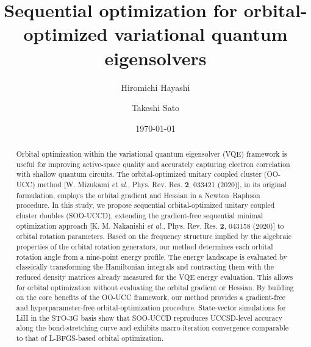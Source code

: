 \documentclass[
 reprint,
 amsmath,amssymb,
 aps,
 physrev,
]{revtex4-2}
\begin{document}
\title{Sequential optimization for orbital-optimized variational quantum eigensolvers}

\author{Hiromichi Hayashi}

\author{Takeshi Sato}
%

\date{\today}

\begin{abstract}
    Orbital optimization within the variational quantum eigensolver (VQE) framework is useful for improving active-space quality and accurately capturing electron correlation with shallow quantum circuits. The orbital-optimized unitary coupled cluster (OO-UCC) method [W. Mizukami \textit{et al.}, Phys. Rev. Res. \textbf{2}, 033421 (2020)], in its original formulation, employs the orbital gradient and Hessian in a Newton–Raphson procedure. In this study, we propose sequential orbital-optimized unitary coupled cluster doubles (SOO-UCCD), extending the gradient-free sequential minimal optimization approach [K. M. Nakanishi \textit{et al.}, Phys. Rev. Res. \textbf{2}, 043158 (2020)] to orbital rotation parameters. Based on the frequency structure implied by the algebraic properties of the orbital rotation generators, our method determines each orbital rotation angle from a nine-point energy profile. The energy landscape is evaluated by classically transforming the Hamiltonian integrals and contracting them with the reduced density matrices already measured for the VQE energy evaluation. This allows for orbital optimization without evaluating the orbital gradient or Hessian. By building on the core benefits of the OO-UCC framework, our method provides a gradient-free and hyperparameter-free orbital-optimization procedure. State-vector simulations for LiH in the STO-3G basis show that SOO-UCCD reproduces UCCSD-level accuracy along the bond-stretching curve and exhibits macro-iteration convergence comparable to that of L-BFGS-based orbital optimization.
\end{abstract}

\maketitle
\end{document}

